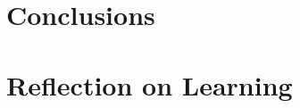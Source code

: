 \documentclass[12pt]{report}
\begin{document}

\section{Conclusions}\label{Conclusions}

\section{Reflection on Learning}\label{Reflection}
\end{document}
